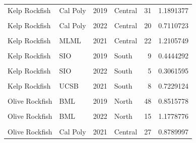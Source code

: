 \documentclass[
]{article}
\begin{document}
\begin{longtable}[t]{llrlrr}
Kelp Rockfish & Cal Poly & 2019 & Central & 31 & 1.1891377\\
\cellcolor{gray!6}{Kelp Rockfish} & \cellcolor{gray!6}{Cal Poly} & \cellcolor{gray!6}{2021} & \cellcolor{gray!6}{Central} & \cellcolor{gray!6}{18} & \cellcolor{gray!6}{1.1932611}\\
Kelp Rockfish & Cal Poly & 2022 & Central & 20 & 0.7110723\\
\cellcolor{gray!6}{Kelp Rockfish} & \cellcolor{gray!6}{MLML} & \cellcolor{gray!6}{2019} & \cellcolor{gray!6}{Central} & \cellcolor{gray!6}{6} & \cellcolor{gray!6}{0.5102564}\\
\addlinespace
Kelp Rockfish & MLML & 2021 & Central & 22 & 1.2105749\\
\cellcolor{gray!6}{Kelp Rockfish} & \cellcolor{gray!6}{MLML} & \cellcolor{gray!6}{2022} & \cellcolor{gray!6}{Central} & \cellcolor{gray!6}{16} & \cellcolor{gray!6}{0.9672937}\\
Kelp Rockfish & SIO & 2019 & South & 9 & 0.4444292\\
\cellcolor{gray!6}{Kelp Rockfish} & \cellcolor{gray!6}{SIO} & \cellcolor{gray!6}{2021} & \cellcolor{gray!6}{South} & \cellcolor{gray!6}{5} & \cellcolor{gray!6}{0.6333333}\\
Kelp Rockfish & SIO & 2022 & South & 5 & 0.3061595\\
\addlinespace
\cellcolor{gray!6}{Kelp Rockfish} & \cellcolor{gray!6}{UCSB} & \cellcolor{gray!6}{2019} & \cellcolor{gray!6}{South} & \cellcolor{gray!6}{17} & \cellcolor{gray!6}{0.5615385}\\
Kelp Rockfish & UCSB & 2021 & South & 8 & 0.7229124\\
\cellcolor{gray!6}{Kelp Rockfish} & \cellcolor{gray!6}{UCSB} & \cellcolor{gray!6}{2022} & \cellcolor{gray!6}{South} & \cellcolor{gray!6}{2} & \cellcolor{gray!6}{0.4496753}\\
Olive Rockfish & BML & 2019 & North & 48 & 0.8515778\\
\cellcolor{gray!6}{Olive Rockfish} & \cellcolor{gray!6}{BML} & \cellcolor{gray!6}{2021} & \cellcolor{gray!6}{North} & \cellcolor{gray!6}{12} & \cellcolor{gray!6}{0.5858886}\\
\addlinespace
Olive Rockfish & BML & 2022 & North & 15 & 1.1778776\\
\cellcolor{gray!6}{Olive Rockfish} & \cellcolor{gray!6}{Cal Poly} & \cellcolor{gray!6}{2019} & \cellcolor{gray!6}{Central} & \cellcolor{gray!6}{183} & \cellcolor{gray!6}{1.8592599}\\
Olive Rockfish & Cal Poly & 2021 & Central & 27 & 0.8789997\\

\end{longtable}
\end{document}
